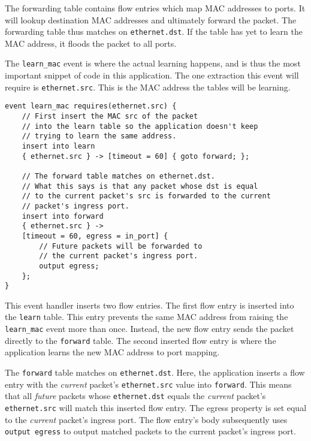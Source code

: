 The forwarding table contains flow entries which map MAC addresses to ports. It will lookup destination MAC addresses and ultimately forward the packet. The forwarding table thus
matches on \texttt{ethernet.dst}. If the table has yet to learn the MAC address, it floods the packet to all ports.

The \texttt{learn\_mac} event is where the actual
learning happens, and is thus the most important snippet of code in this
application. The one extraction this event will require is \texttt{ethernet.src}.
This is the MAC address the tables will be learning.

\begin{codepage}
\begin{lstlisting}
event learn_mac requires(ethernet.src) {
	// First insert the MAC src of the packet
	// into the learn table so the application doesn't keep
	// trying to learn the same address.
	insert into learn
	{ ethernet.src } -> [timeout = 60] { goto forward; };

	// The forward table matches on ethernet.dst.
	// What this says is that any packet whose dst is equal
	// to the current packet's src is forwarded to the current 
	// packet's ingress port.
	insert into forward
	{ ethernet.src } ->
	[timeout = 60, egress = in_port] {
		// Future packets will be forwarded to
		// the current packet's ingress port.
		output egress;
	};
}
\end{lstlisting}
\end{codepage}

This event handler inserts two flow entries. The first flow entry is inserted into
the \texttt{learn} table. 
This entry prevents the same MAC address from raising the
\texttt{learn\_mac} event more than once.
Instead, the new flow entry sends the packet directly to the \texttt{forward} 
table.
The second inserted flow entry is where the application
learns the new MAC address to port mapping.

The \texttt{forward} table matches on \texttt{ethernet.dst}.
Here, the application inserts a flow entry with the \textit{current} packet's 
\texttt{ethernet.src} value into \texttt{forward}.
This means that all \textit{future} packets whose
\texttt{ethernet.dst} equals the \textit{current} packet's \texttt{ethernet.src}
will match this inserted flow entry. The egress property is set equal to the
\textit{current} packet's ingress port. The flow entry's body subsequently uses
\texttt{output egress} to output matched packets to the current packet's ingress port.

